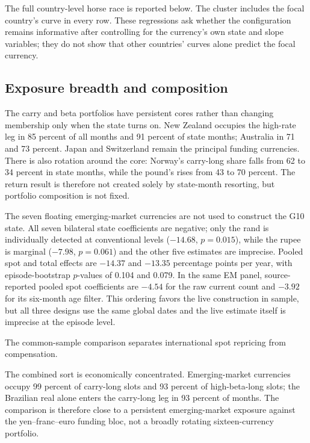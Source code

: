 The full country-level horse race is reported below. The cluster includes the focal country's curve in every row. These regressions ask whether the configuration remains informative after controlling for the currency's own state and slope variables; they do not show that other countries' curves alone predict the focal currency.



\subsection{Exposure breadth and composition}

The carry and beta portfolios have persistent cores rather than changing membership only when the state turns on. New Zealand occupies the high-rate leg in 85 percent of all months and 91 percent of state months; Australia in 71 and 73 percent. Japan and Switzerland remain the principal funding currencies. There is also rotation around the core: Norway's carry-long share falls from 62 to 34 percent in state months, while the pound's rises from 43 to 70 percent. The return result is therefore not created solely by state-month resorting, but portfolio composition is not fixed.



The seven floating emerging-market currencies are not used to construct the G10 state. All seven bilateral state coefficients are negative; only the rand is individually detected at conventional levels ($-14.68$, $p=0.015$), while the rupee is marginal ($-7.98$, $p=0.061$) and the other five estimates are imprecise. Pooled spot and total effects are $-14.37$ and $-13.35$ percentage points per year, with episode-bootstrap $p$-values of 0.104 and 0.079. In the same EM panel, source-reported pooled spot coefficients are $-4.54$ for the raw current count and $-3.92$ for its six-month age filter. This ordering favors the live construction in sample, but all three designs use the same global dates and the live estimate itself is imprecise at the episode level.

The common-sample comparison separates international spot repricing from compensation.



The combined sort is economically concentrated. Emerging-market currencies occupy 99 percent of carry-long slots and 93 percent of high-beta-long slots; the Brazilian real alone enters the carry-long leg in 93 percent of months. The comparison is therefore close to a persistent emerging-market exposure against the yen--franc--euro funding bloc, not a broadly rotating sixteen-currency portfolio.

